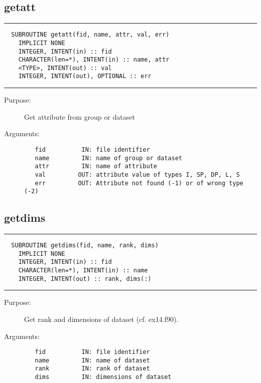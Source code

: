 \documentclass[a4paper]{article}
\begin{document}
\subsection{getatt}

\par
\addvspace{\medskipamount}
\nopagebreak\hrule
\begin{verbatim}
  SUBROUTINE getatt(fid, name, attr, val, err)
    IMPLICIT NONE
    INTEGER, INTENT(in) :: fid
    CHARACTER(len=*), INTENT(in) :: name, attr
    <TYPE>, INTENT(out) :: val
    INTEGER, INTENT(out), OPTIONAL :: err
\end{verbatim}
\nopagebreak\hrule
\addvspace{\medskipamount}

\begin{description}
\item[Purpose:] \mbox{}

Get attribute from group or dataset

\item[Arguments:] \mbox{}

\begin{verbatim}
   fid          IN: file identifier
   name         IN: name of group or dataset
   attr         IN: name of attribute
   val         OUT: attribute value of types I, SP, DP, L, S
   err         OUT: Attribute not found (-1) or of wrong type (-2)

\end{verbatim}


\end{description}





\subsection{getdims}

\par
\addvspace{\medskipamount}
\nopagebreak\hrule
\begin{verbatim}
  SUBROUTINE getdims(fid, name, rank, dims)
    IMPLICIT NONE
    INTEGER, INTENT(in) :: fid
    CHARACTER(len=*), INTENT(in) :: name
    INTEGER, INTENT(out) :: rank, dims(:)
\end{verbatim}
\nopagebreak\hrule
\addvspace{\medskipamount}

\begin{description}
\item[Purpose:] \mbox{}

Get rank and dimensions of dataset (cf. ex14.f90).

\item[Arguments:] \mbox{}

\begin{verbatim}
   fid          IN: file identifier
   name         IN: name of dataset
   rank         IN: rank of dataset
   dims         IN: dimensions of dataset

\end{verbatim}


\end{description}
\end{document}
